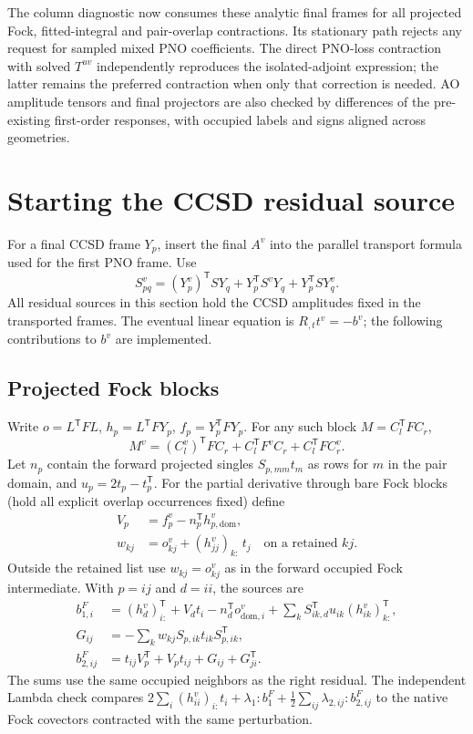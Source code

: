 \documentclass[11pt]{article}
\begin{document}
The column diagnostic now consumes these analytic final frames for all
projected Fock, fitted-integral and pair-overlap contractions. Its stationary
path rejects any request for sampled mixed PNO coefficients. The direct
PNO-loss contraction with solved $T^{uv}$ independently reproduces the
isolated-adjoint expression; the latter remains the preferred contraction
when only that correction is needed. AO amplitude tensors and final
projectors are also checked by differences of the pre-existing first-order
responses, with occupied labels and signs aligned across geometries.

\section{Starting the CCSD residual source}
For a final CCSD frame $Y_p$, insert the final $A^v$ into the parallel
transport formula used for the first PNO frame. Use
\begin{equation}
 S_{pq}^v=(Y_p^v)^{\mathsf T}SY_q+Y_p^{\mathsf T}S^vY_q+
 Y_p^{\mathsf T}S Y_q^v .
\end{equation}
All residual sources in this section hold the CCSD amplitudes fixed in the
transported frames. The eventual linear equation is $R_{,t}t^v=-b^v$;
the following contributions to $b^v$ are implemented.

\subsection{Projected Fock blocks}
Write $o=L^{\mathsf T}FL$, $h_p=L^{\mathsf T}FY_p$,
$f_p=Y_p^{\mathsf T}FY_p$. For any such block $M=C_l^{\mathsf T}FC_r$,
\begin{equation}
 M^v=(C_l^v)^{\mathsf T}FC_r+C_l^{\mathsf T}F^v C_r+
 C_l^{\mathsf T}FC_r^v .
\end{equation}
Let $n_p$ contain the forward projected singles $S_{p,mm}t_m$ as rows for
$m$ in the pair domain, and $u_p=2t_p-t_p^{\mathsf T}$.
For the partial derivative through bare Fock blocks (hold all explicit
overlap occurrences fixed) define
\begin{align}
 V_p&=f_p^v-n_p^{\mathsf T}h_{p,\mathrm{dom}}^v,\\
 w_{kj}&=o^v_{kj}+(h^v_{jj})_{k:}\,t_j
 \quad\text{on a retained }kj .
\end{align}
Outside the retained list use $w_{kj}=o^v_{kj}$ as in the forward occupied
Fock intermediate. With $p=ij$ and $d=ii$, the sources are
\begin{align}
 b_{1,i}^{F}&=(h_d^v)_{i:}^{\mathsf T}+V_d t_i-
 n_d^{\mathsf T}o^v_{\mathrm{dom},i}
 +\sum_{k} S_{ik,d}^{\mathsf T}u_{ik}(h_{ik}^v)_{k:}^{\mathsf T},\\
 G_{ij}&=-\sum_{k}w_{kj} S_{p,ik}t_{ik}S_{p,ik}^{\mathsf T},\\
 b_{2,ij}^{F}&=t_{ij} V_p^{\mathsf T}+V_p t_{ij}
                  +G_{ij}+G_{ji}^{\mathsf T}.
\end{align}
The sums use the same occupied neighbors as the right residual. The independent
Lambda check compares $2\sum_i (h_{ii}^v)_{i:}t_i+\lambda_1:b_1^F+
\tfrac12\sum_{ij}\lambda_{2,ij}:b_{2,ij}^F$ to the native Fock covectors
contracted with the same perturbation.
\end{document}
